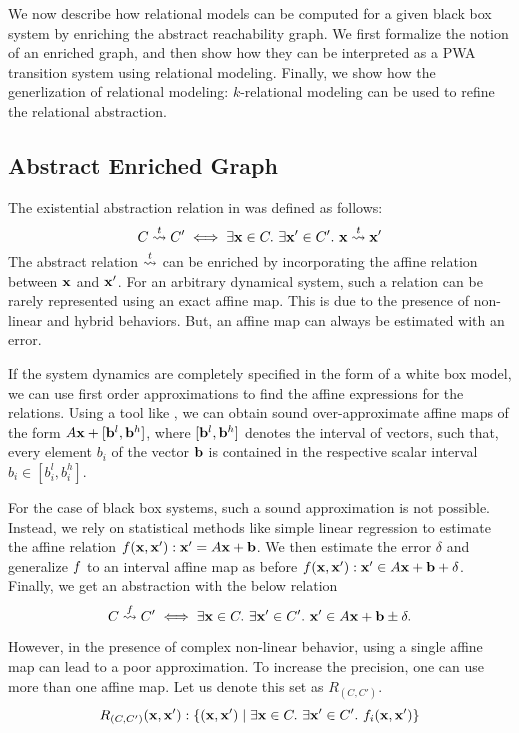 
We now describe how relational models can be computed for a given
black box system by enriching the abstract reachability graph. We
first formalize the notion of an enriched graph, and then show how
they can be interpreted as a PWA transition system using relational
modeling. Finally, we show how the generlization of relational
modeling: $k$-relational modeling can be used to refine the relational
abstraction.

\subsection{Abstract Enriched Graph}

The existential abstraction relation in \cite{zutshi2014multiple} was defined as
follows:
\[
    C \overset{t}{\rightsquigarrow} C' \iff \exists \mathbf{x} \in C.\ \exists \mathbf{x}' \in C'.\ \mathbf{x} \overset{t}{\rightsquigarrow} \mathbf{x}'
\]
The abstract relation $\overset{t}{\rightsquigarrow}$ can be enriched by incorporating
the affine relation between $\mathbf{x}$ and $\mathbf{x}'$. For an arbitrary dynamical
system, such a relation can be rarely represented using an exact affine map.
This is due to the presence of non-linear and hybrid behaviors. But,
an affine map can always be estimated with an error.

If the system dynamics are completely specified in the form of a white
box model, we can use first order approximations to find the affine
expressions for the relations. Using a tool like \flowstar, we can
obtain sound over-approximate affine maps of the form $A\mathbf{x} + [\mathbf{b}^l,
\mathbf{b}^h]$, where $[\mathbf{b}^l,\mathbf{b}^h]$ denotes the interval of vectors, such
that, every element $b_i$ of the vector $\mathbf{b}$ is contained in the
respective scalar interval $b_i\in[b^l_i,b^h_i]$.

For the case of black box systems, such a sound approximation is not
possible. Instead, we rely on statistical methods like simple linear
regression to estimate the affine relation $f(\mathbf{x},\mathbf{x}'): \mathbf{x}'=A\mathbf{x} + \mathbf{b}$. We then
estimate the error $\delta$ and generalize $f$ to an interval
affine map as before $f(\mathbf{x},\mathbf{x}'): \mathbf{x}' \in A\mathbf{x} + \mathbf{b} + \delta$.  Finally, we get an
abstraction with the below relation
\[
    C \overset{f}{\rightsquigarrow} C' \iff \exists \mathbf{x} \in C.\ \exists \mathbf{x}' \in C'.\ \mathbf{x}' \in A\mathbf{x} + \mathbf{b} \pm \delta.
\]

However, in the presence of complex non-linear behavior, using a
single affine map can lead to a poor approximation. To increase the
precision, one can use more than one affine map. Let us denote this set as
$R_{(C,C')}$.%
\[
    R_{(C,C')}(\mathbf{x},\mathbf{x}'): \{(\mathbf{x},\mathbf{x}') \;|\; \exists \mathbf{x} \in C.\ \exists \mathbf{x}' \in C'.\ f_i(\mathbf{x},\mathbf{x}')\}
\]


